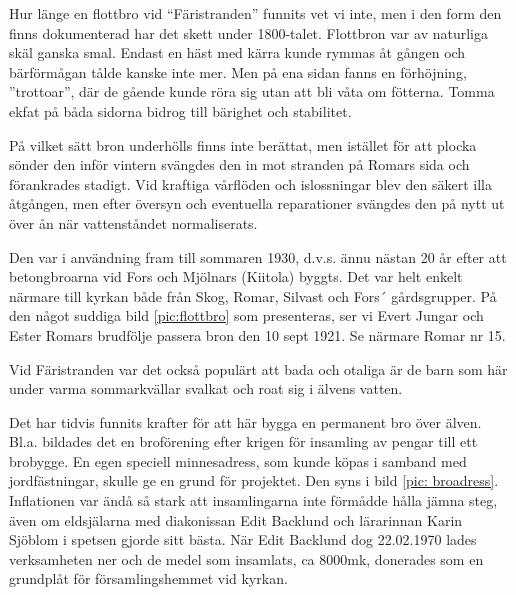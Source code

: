 Hur länge en flottbro vid ``Färistranden'' funnits vet vi inte, men i den form den finns dokumenterad har det skett under 1800-talet. Flottbron var av naturliga skäl ganska smal. Endast en häst med kärra kunde rymmas åt gången och bärförmågan tålde kanske inte mer. Men på  ena sidan fanns en förhöjning, ”trottoar”, där de gående kunde röra sig utan att bli våta om fötterna. Tomma ekfat på båda sidorna bidrog till bärighet och stabilitet.

På vilket sätt bron underhölls finns inte berättat, men istället för att plocka sönder den inför vintern svängdes den in mot stranden på Romars sida och förankrades stadigt. Vid kraftiga vårflöden och islossningar blev den säkert illa åtgången, men efter översyn och eventuella reparationer svängdes den på nytt ut över ån när vattenståndet normaliserats.

Den var i användning fram till sommaren 1930, d.v.s. ännu nästan 20 år efter att betongbroarna vid Fors och Mjölnars (Kiitola) byggts. Det var helt enkelt närmare till kyrkan både från Skog, Romar, Silvast och Fors´ gårdsgrupper. På den något suddiga bild \ref{pic:flottbro} som presenteras, ser vi Evert Jungar och Ester Romars brudfölje passera bron den 10 sept 1921. Se närmare Romar nr 15.

Vid Färistranden var det också populärt att bada och otaliga är de barn som här under varma sommarkvällar svalkat och roat sig i älvens vatten.


Det har tidvis funnits krafter för att här bygga en permanent bro över älven. Bl.a. bildades det en broförening efter krigen för insamling av pengar till ett brobygge. En egen speciell minnesadress, som kunde köpas i samband med jordfästningar, skulle ge en grund för projektet. Den syns i bild \ref{pic: broadress}. Inflationen var ändå så stark att insamlingarna inte förmådde hålla jämna steg, även om eldsjälarna med diakonissan Edit Backlund och lärarinnan Karin Sjöblom i spetsen gjorde sitt bästa. När Edit Backlund dog 22.02.1970 lades verksamheten ner och de medel som insamlats, ca 8000mk, donerades som en grundplåt för församlingshemmet vid kyrkan.



%



